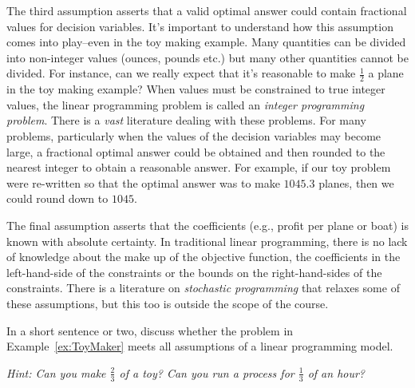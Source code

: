 The third assumption asserts that a valid optimal answer could contain fractional values for decision variables. It's important to understand how this assumption comes into play--even in the toy making example. Many quantities can be divided into non-integer values (ounces, pounds etc.) but many other quantities cannot be divided. For instance, can we really expect that it's reasonable to make $\tfrac{1}{2}$ a plane in the toy making example? When values must be constrained to true integer values, the linear programming problem is called an \textit{integer programming problem}.  There is a \textit{vast} literature dealing with these problems. %
For many problems, particularly when the values of the decision variables may become large, a fractional optimal answer could be obtained and then rounded to the nearest integer to obtain a reasonable answer. For example, if our toy problem were re-written so that the optimal answer was to make $1045.3$ planes, then we could round down to $1045$.

The final assumption asserts that the coefficients (e.g., profit per plane or boat) is known with absolute certainty. In traditional linear programming, there is no lack of knowledge about the make up of the objective function, the coefficients in the left-hand-side of the constraints or the bounds on the right-hand-sides of the constraints. There is a literature on \textit{stochastic programming} %
that relaxes some of these assumptions, but this too is outside the scope of the course.

\begin{learningcheckpoint}
In a short sentence or two, discuss whether the problem in
Example~\ref{ex:ToyMaker} meets all assumptions of a linear programming model.

\emph{Hint: Can you make $\tfrac{2}{3}$ of a toy? Can you run a process
for $\tfrac{1}{3}$ of an hour?}
\end{learningcheckpoint}


%








